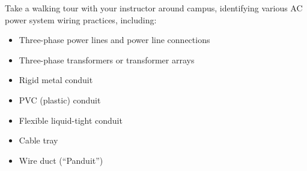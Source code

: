 

Take a walking tour with your instructor around campus, identifying various AC power system wiring practices, including:

\begin{itemize}
\item{} Three-phase power lines and power line connections
\vskip 10pt
\item{} Three-phase transformers or transformer arrays
\vskip 10pt
\item{} Rigid metal conduit
\vskip 10pt
\item{} PVC (plastic) conduit
\vskip 10pt
\item{} Flexible liquid-tight conduit
\vskip 10pt
\item{} Cable tray
\vskip 10pt
\item{} Wire duct (``Panduit'')
\end{itemize}


















